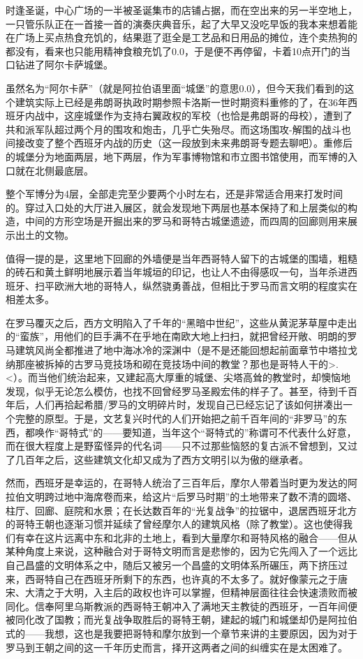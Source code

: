 \documentclass[]{book}
\begin{document}
时逢圣诞，中心广场的一半被圣诞集市的店铺占据，而在空出来的另一半空地上，一只管乐队正在一首接一首的演奏庆典音乐，起了大早又没吃早饭的我本来想着能在广场上买点热食充饥的，结果逛了逛全是工艺品和日用品的摊位，连个卖热狗的都没有，看来也只能用精神食粮充饥了0.0，于是便不再停留，卡着10点开门的当口钻进了阿尔卡萨城堡。

虽然名为``阿尔卡萨''（就是阿拉伯语里面``城堡''的意思0.0），但今天我们看到的这个建筑实际上已经是弗朗哥执政时期参照卡洛斯一世时期资料重修的了，在36年西班牙内战中，这座城堡作为支持右翼政权的军校（也恰是弗朗哥的母校），遭到了共和派军队超过两个月的围攻和炮击，几乎亡失殆尽。而这场围攻-解围的战斗也间接改变了整个西班牙内战的历史（这一段放到未来弗朗哥专题去聊吧）。重修后的城堡分为地面两层，地下两层，作为军事博物馆和市立图书馆使用，而军博的入口就在北侧最底层。

整个军博分为4层，全部走完至少要两个小时左右，还是非常适合用来打发时间的。穿过入口处的大厅进入展区，就会发现地下两层也基本保持了和上层类似的构造，中间的方形空场是开掘出来的罗马和哥特古城堡遗迹，而四周的回廊则用来展示出土的文物。

值得一提的是，这里地下回廊的外墙便是当年西哥特人留下的古城堡的围墙，粗糙的砖石和黄土鲜明地展示着当年城垣的印记，也让人不由得感叹一句，当年杀进西班牙、扫平欧洲大地的哥特人，纵然骁勇善战，但相比于罗马而言文明的程度实在相差太多。

在罗马覆灭之后，西方文明陷入了千年的``黑暗中世纪''，这些从黄泥茅草屋中走出的``蛮族''，用他们的巨手满不在乎地在南欧大地上扫扫，就把曾经开敞、明朗的罗马建筑风尚全都推进了地中海冰冷的深渊中（是不是还能回想起前面章节中塔拉戈纳那座被拆掉的古罗马竞技场和砌在竞技场中间的教堂？那也是哥特人干的\textgreater{}.\textless{}）。而当他们统治起来，又建起高大厚重的城堡、尖塔高耸的教堂时，却懊恼地发现，似乎无论怎么模仿，也找不回曾经罗马圣殿宏伟的样子了。甚至，待到千百年后，人们再拾起希腊/罗马的文明碎片时，发现自己已经忘记了该如何拼凑出一个完整的原型。于是，文艺复兴时代的人们开始把之前千百年间的``非罗马''的东西，都唤作``哥特式''的------要知道，当年这个``哥特式的''称谓可不代表什么好意，而在很大程度上是野蛮怪异的代名词------只不过那些恼怒的复古派不曾想到，又过了几百年之后，这些建筑文化却又成为了西方文明引以为傲的继承者。

然而，西班牙是幸运的，在哥特人统治了三百年后，摩尔人带着当时更为发达的阿拉伯文明跨过地中海席卷而来，给这片``后罗马时期''的土地带来了数不清的圆塔、柱厅、回廊、庭院和水景；在长达数百年的``光复战争''的拉锯中，退居西班牙北方的哥特王朝也逐渐习惯并延续了曾经摩尔人的建筑风格（除了教堂）。这也使得我们有幸在这片远离中东和北非的土地上，看到大量摩尔和哥特风格的融合------但从某种角度上来说，这种融合对于哥特文明而言是悲惨的，因为它先闯入了一个远比自己昌盛的文明体系之中，随后又被另一个昌盛的文明体系所碾压，两下挤压过来，西哥特自己在西班牙所剩下的东西，也许真的不太多了。就好像蒙元之于唐宋、大清之于大明，入主后的政权也许可以掌握，但精神层面往往会快速溃败而被同化。信奉阿里乌斯教派的西哥特王朝冲入了满地天主教徒的西班牙，一百年间便被同化改了国教；而光复战争取胜后的哥特王朝，建起的城门和城堡却仍是阿拉伯式的------我想，这也是我要把哥特和摩尔放到一个章节来讲的主要原因，因为对于罗马到王朝之间的这一千年历史而言，择开这两者之间的纠缠实在是太困难了。
\end{document}
